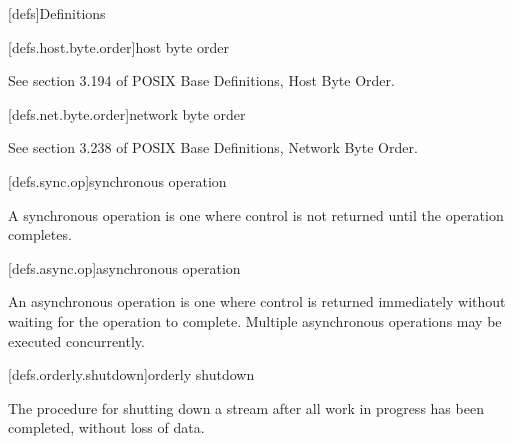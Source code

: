 
[defs]{Definitions}


[defs.host.byte.order]{host byte order}

See section 3.194 of POSIX Base Definitions, Host Byte Order.

[defs.net.byte.order]{network byte order}

See section 3.238 of POSIX Base Definitions, Network Byte Order.

[defs.sync.op]{synchronous operation}

A synchronous operation is one where control is not returned until the
operation completes.

[defs.async.op]{asynchronous operation}

An asynchronous operation is one where control is returned immediately
without waiting for the operation to complete. Multiple asynchronous
operations may be executed concurrently.

[defs.orderly.shutdown]{orderly shutdown}

The procedure for shutting down a stream after all work in progress has
been completed, without loss of data.

